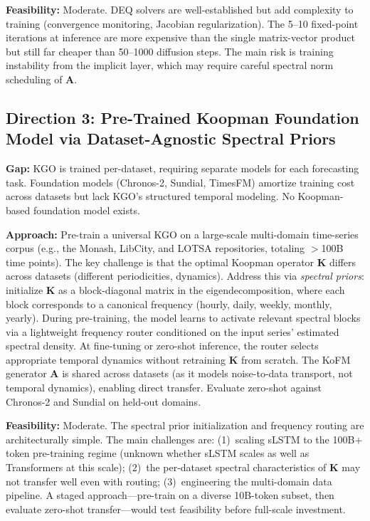 \documentclass[11pt,a4paper]{article}
\begin{document}
\textbf{Feasibility:} Moderate. DEQ solvers are well-established but add complexity to training (convergence monitoring, Jacobian regularization). The 5--10 fixed-point iterations at inference are more expensive than the single matrix-vector product but still far cheaper than 50--1000 diffusion steps. The main risk is training instability from the implicit layer, which may require careful spectral norm scheduling of $\mathbf{A}$.

\subsection{Direction 3: Pre-Trained Koopman Foundation Model via Dataset-Agnostic Spectral Priors}
\textbf{Gap:} KGO is trained per-dataset, requiring separate models for each forecasting task. Foundation models (Chronos-2, Sundial, TimesFM) amortize training cost across datasets but lack KGO's structured temporal modeling. No Koopman-based foundation model exists.

\textbf{Approach:} Pre-train a universal KGO on a large-scale multi-domain time-series corpus (e.g., the Monash, LibCity, and LOTSA repositories, totaling $>$100B time points). The key challenge is that the optimal Koopman operator $\mathbf{K}$ differs across datasets (different periodicities, dynamics). Address this via \emph{spectral priors}: initialize $\mathbf{K}$ as a block-diagonal matrix in the eigendecomposition, where each block corresponds to a canonical frequency (hourly, daily, weekly, monthly, yearly). During pre-training, the model learns to activate relevant spectral blocks via a lightweight frequency router conditioned on the input series' estimated spectral density. At fine-tuning or zero-shot inference, the router selects appropriate temporal dynamics without retraining $\mathbf{K}$ from scratch. The KoFM generator $\mathbf{A}$ is shared across datasets (as it models noise-to-data transport, not temporal dynamics), enabling direct transfer. Evaluate zero-shot against Chronos-2 and Sundial on held-out domains.

\textbf{Feasibility:} Moderate. The spectral prior initialization and frequency routing are architecturally simple. The main challenges are: (1)~scaling sLSTM to the 100B+ token pre-training regime (unknown whether sLSTM scales as well as Transformers at this scale); (2)~the per-dataset spectral characteristics of $\mathbf{K}$ may not transfer well even with routing; (3)~engineering the multi-domain data pipeline. A staged approach---pre-train on a diverse 10B-token subset, then evaluate zero-shot transfer---would test feasibility before full-scale investment.
\end{document}
